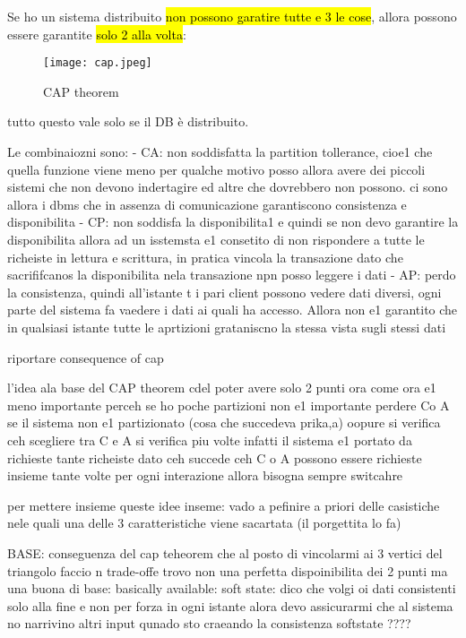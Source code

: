 Se ho un sistema distribuito \hl{non possono garatire tutte e 3 le cose}, allora possono essere garantite \hl{solo 2 alla volta}:

\begin{figure}[H]
\centering
\texttt{[image: cap.jpeg]}
\caption{CAP theorem} 
\label{cap}
\end{figure}


tutto questo vale solo se il DB è distribuito.

Le combinaiozni sono:
- CA: non soddisfatta la partition tollerance, cioe1 che quella funzione viene meno per qualche motivo posso allora avere dei piccoli sistemi che non devono indertagire ed altre che dovrebbero non possono. ci sono allora i dbms che in assenza di comunicazione garantiscono consistenza e disponibilita
- CP: non soddisfa la disponibilita1 e quindi se non devo garantire la disponibilita allora ad un isstemsta e1 consetito di non rispondere a tutte le richeiste in lettura e scrittura, in pratica vincola la transazione dato che sacrififcanos la disponibilita nela transazione npn posso leggere i dati 
- AP: perdo la consistenza, quindi all'istante t i pari client possono vedere dati diversi, ogni parte del sistema fa vaedere i dati ai quali ha accesso. Allora non e1 garantito che in qualsiasi istante tutte le aprtizioni grataniscno la stessa vista sugli stessi dati

riportare consequence of cap

l'idea ala base del CAP theorem cdel poter avere solo 2 punti ora come ora e1 meno importante perceh se ho poche partizioni non e1 importante perdere Co A se il sistema non e1 partizionato (cosa che succedeva prika,a) oopure si verifica ceh scegliere tra C e A si verifica piu volte infatti il sistema e1 portato da richieste  tante richeiste dato ceh succede ceh C o A possono essere richieste insieme tante volte per ogni interazione allora bisogna sempre switcahre 


per mettere insieme queste idee inseme: vado a pefinire a priori delle casistiche nele quali una delle 3 caratteristiche viene sacartata (il porgettita lo fa)



BASE: conseguenza del cap teheorem che al posto di vincolarmi ai 3 vertici del triangolo faccio n trade-offe trovo non una perfetta dispoinibilita dei 2 punti ma una buona di base:
basically available:
soft state: dico che volgi oi dati consistenti solo alla fine e non per forza in ogni istante alora devo assicurarmi che al sistema no narrivino altri input qunado sto craeando la consistenza
softstate ????

